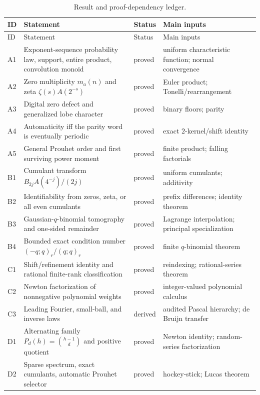 \documentclass[11pt,oneside]{article}
\numberwithin{equation}{section}
\theoremstyle{definition}
\theoremstyle{remark}
\begin{document}
\begin{longtable}{@{}>{\raggedright\arraybackslash}p{}>{\raggedright\arraybackslash}p{}>{\raggedright\arraybackslash}p{}>{\raggedright\arraybackslash}p{}@{}}
\caption{Result and proof-dependency ledger.}
\label{tab:result-ledger}\\
\toprule
ID & Statement & Status & Main inputs\\
\midrule
\endfirsthead
\toprule
ID & Statement & Status & Main inputs\\
\midrule
\endhead
A1 & Exponent-sequence probability law, support, entire product, convolution monoid & proved & uniform characteristic function; normal convergence\\
A2 & Zero multiplicity $m_a(n)$ and zeta $\zeta(s)A(2^{-s})$ & proved & Euler product; Tonelli/rearrangement\\
A3 & Digital zero defect and generalized lobe character & proved & binary floors; parity\\
A4 & Automaticity iff the parity word is eventually periodic & proved & exact $2$-kernel/shift identity\\
A5 & General Prouhet order and first surviving power moment & proved & finite product; falling factorials\\
B1 & Cumulant transform $B_{2j}A(4^{-j})/(2j)$ & proved & uniform cumulants; additivity\\
B2 & Identifiability from zeros, zeta, or all even cumulants & proved & prefix differences; identity theorem\\
B3 & Gaussian-$q$-binomial tomography and one-sided remainder & proved & Lagrange interpolation; principal specialization\\
B4 & Bounded exact condition number $(-q;q)_r/(q;q)_r$ & proved & finite $q$-binomial theorem\\
C1 & Shift/refinement identity and rational finite-rank classification & proved & reindexing; rational-series theorem\\
C2 & Newton factorization of nonnegative polynomial weights & proved & integer-valued polynomial calculus\\
C3 & Leading Fourier, small-ball, and inverse laws & derived & audited Pascal hierarchy; de Bruijn transfer\\
D1 & Alternating family $P_d(h)=\binom{h-1}{d}$ and positive quotient & proved & Newton identity; random-series factorization\\
D2 & Sparse spectrum, exact cumulants, automatic Prouhet selector & proved & hockey-stick; Lucas theorem\\

\end{longtable}
\end{document}

